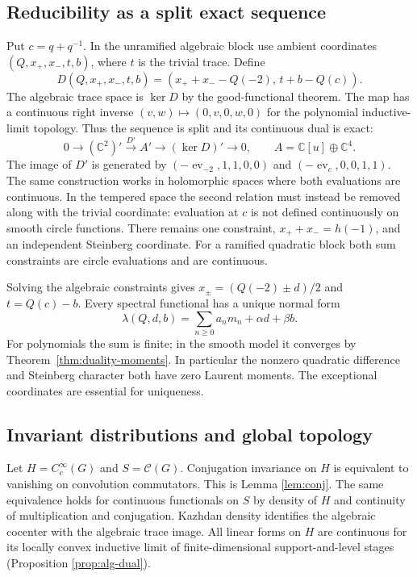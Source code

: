 \subsection{Reducibility as a split exact sequence}
Put $c=q+q^{-1}$. In the unramified algebraic block use ambient coordinates $(Q,x_+,x_-,t,b)$, where $t$ is the trivial trace. Define
\[
D(Q,x_+,x_-,t,b)=(x_++x_--Q(-2),\,t+b-Q(c)).
\]
The algebraic trace space is $\ker D$ by the good-functional theorem. The map has a continuous right inverse $(v,w)\mapsto(0,v,0,w,0)$ for the polynomial inductive-limit topology. Thus the sequence is split and its continuous dual is exact:
\[
0\longrightarrow(\mathbb C^2)'\xrightarrow{D'} A'
 \longrightarrow(\ker D)'\longrightarrow0,\qquad
 A=\mathbb C[u]\oplus\mathbb C^4.
\]
The image of $D'$ is generated by
$(-\operatorname{ev}_{-2},1,1,0,0)$ and
$(-\operatorname{ev}_c,0,0,1,1)$.
The same construction works in holomorphic spaces where both evaluations are continuous. In the tempered space the second relation must instead be removed along with the trivial coordinate: evaluation at $c$ is not defined continuously on smooth circle functions. There remains one constraint, $x_++x_-=h(-1)$, and an independent Steinberg coordinate. For a ramified quadratic block both sum constraints are circle evaluations and are continuous.

\begin{center}
\end{center}
Solving the algebraic constraints gives $x_\pm=(Q(-2)\pm d)/2$ and $t=Q(c)-b$. Every spectral functional has a unique normal form
\[
\lambda(Q,d,b)=\sum_{n\ge0}a_nm_n+\alpha d+\beta b.
\]
For polynomials the sum is finite; in the smooth model it converges by Theorem~\ref{thm:duality-moments}. In particular the nonzero quadratic difference and Steinberg character both have zero Laurent moments. The exceptional coordinates are essential for uniqueness.

\subsection{Invariant distributions and global topology}
Let $H=C_c^\infty(G)$ and $S=\mathcal C(G)$. Conjugation invariance on $H$ is equivalent to vanishing on convolution commutators. This is Lemma \ref{lem:conj}. The same equivalence holds for continuous functionals on $S$ by density of $H$ and continuity of multiplication and conjugation. Kazhdan density identifies the algebraic cocenter with the algebraic trace image. All linear forms on $H$ are continuous for its locally convex inductive limit of finite-dimensional support-and-level stages (Proposition \ref{prop:alg-dual}).

